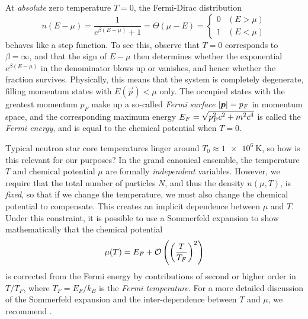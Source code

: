 At \emph{absolute} zero temperature $T = 0$, the Fermi-Dirac distribution
\begin{equation}
	n(E-\mu) = \frac{1}{e^{\beta (E - \mu)} + 1} = \Theta(\mu-E) = \begin{cases} 0 & (E > \mu) \\ 1 & (E < \mu) \end{cases}
\end{equation}
behaves like a step function.
To see this, observe that $T = 0$ corresponds to $\beta = \infty$, and that the sign of $E - \mu$ then determines whether the exponential $e^{\beta (E - \mu)}$ in the denominator blows up or vanishes, and hence whether the fraction survives.
Physically, this means that the system is completely degenerate, filling momentum states with $E(\vec{p}) < \mu$ only.
The occupied states with the greatest momentum $p_F$ make up a so-called \emph{Fermi surface} $\left\lvert {\bm{p}} \right\rvert = p_F$ in momentum space, and the corresponding maximum energy $E_F = \sqrt{\smash[b]{p_F^2 c^2 + m^2 c^4}}$ is called the \emph{Fermi energy}, and is equal to the chemical potential when $T = 0$.

Typical neutron star core temperatures linger around $T_0 \approx \SI{1e6}{\kelvin}$, \cite{ref:glendenning} so how is this relevant for our purposes?
In the grand canonical ensemble, the temperature $T$ and chemical potential $\mu$ are formally \emph{independent} variables.
However, we require that the total number of particles $N$, and thus the density $n(\mu, T)$, is \emph{fixed}, so that if we change the temperature, we must also change the chemical potential to compensate.
This creates an implicit dependence between $\mu$ and $T$.
Under this constraint, it is possible to use a Sommerfeld expansion to show mathematically that the chemical potential
\begin{equation}
	\mu(T) = E_F + \mathcal{O} \left( \left( \frac{T}{T_F} \right)^2 \right)
\end{equation}
is corrected from the Fermi energy by contributions of second or higher order in $T / T_F$, where $T_F = E_F / k_B$ is the \emph{Fermi temperature}.
For a more detailed discussion of the Sommerfeld expansion and the inter-dependence between $T$ and $\mu$, we recommend \cite[section 3.6]{ref:notes_statistical_physics_tong}.%

